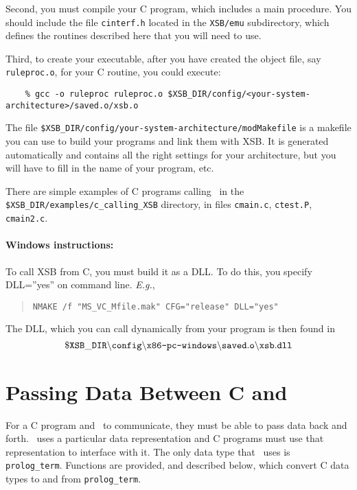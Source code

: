 Second, you must compile your C program, which includes a main
procedure.  You should include the file {\tt cinterf.h} located in the
{\tt XSB/emu} subdirectory, which defines the routines described here
that you will need to use.

Third, to create your executable, after you have created the object
file, say {\tt ruleproc.o}, for your C routine, you could execute:
\begin{verbatim}
    % gcc -o ruleproc ruleproc.o $XSB_DIR/config/<your-system-architecture>/saved.o/xsb.o
\end{verbatim}

The file {\tt \$XSB\_DIR/config/your-system-architecture/modMakefile} is a
makefile you can use to build your programs and link them with XSB.  It is
generated automatically and contains all the right settings for your
architecture, but you will have to fill in the name of your program, etc.

There are simple examples of C programs calling \ourprolog\ in the
{\tt \$XSB\_DIR/examples/c\_calling\_XSB} directory, in files {\tt cmain.c},
{\tt ctest.P}, {\tt cmain2.c}.

\paragraph{Windows instructions:}
To call XSB from C, you must build it as a DLL. To do this, you specify
DLL=''yes'' on command line. {\it E.g.}, 
\begin{quote}
 {\tt NMAKE /f "MS\_VC\_Mfile.mak" CFG="release" DLL="yes"  }
\end{quote}
The DLL, which you can call dynamically from your program is then found in 
\[
 \tt
 \$XSB\_DIR\backslash config\backslash \mbox{\tt x86-pc-windows}\backslash
 saved.o \backslash xsb.dll
\]

\section{Passing Data Between C and \ourprolog} \label{c2p_p2p_p2c}

For a C program and \ourprolog\ to communicate, they must be able to
pass data back and forth. \ourprolog\ uses a particular data
representation and C programs must use that representation to
interface with it.  The only data type that \ourprolog\ uses is {\tt
prolog\_term}.  Functions are provided, and described below, which convert
C data types to and from {\tt prolog\_term}.

